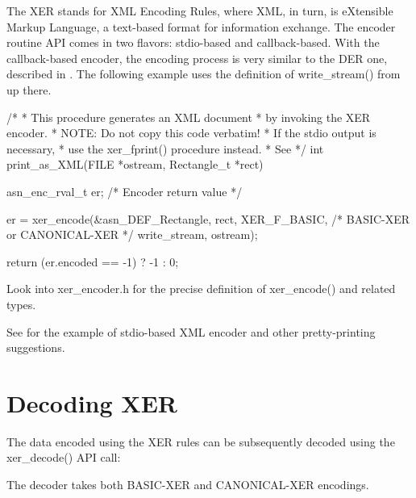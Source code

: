 \documentclass[english,oneside,12pt]{book}
\begin{document}
The XER stands for XML Encoding Rules, where XML, in turn, is eXtensible
Markup Language, a text-based format for information exchange. The
encoder routine API comes in two flavors: stdio-based and callback-based.
With the callback-based encoder, the encoding process is very similar
to the DER one, described in . The
following example uses the definition of write\_stream() from up there.
\begin{codesample}
/*
 * This procedure generates an XML document
 * by invoking the XER encoder.
 * NOTE: Do not copy this code verbatim!
 *       If the stdio output is necessary,
 *       use the xer_fprint() procedure instead.
 *       See %
 */
int
print_as_XML(FILE *ostream, Rectangle_t *rect) {
    asn_enc_rval_t er;  /* Encoder return value */

    er = xer_encode(&asn_DEF_Rectangle, rect,
        XER_F_BASIC, /* BASIC-XER or CANONICAL-XER */
        write_stream, ostream);

    return (er.encoded == -1) ? -1 : 0;
}
\end{codesample}
Look into xer\_encoder.h for the precise definition of xer\_encode()
and related types.

See  for the example of stdio-based
XML encoder and other pretty-printing suggestions.


\section{\label{sec:Decoding-XER}Decoding XER}

The data encoded using the XER rules can be subsequently decoded using
the xer\_decode() API call:
The decoder takes both BASIC-XER and CANONICAL-XER encodings.
\end{document}
